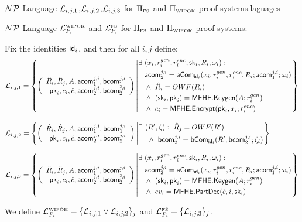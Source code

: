 \begin{boxfig}{${{\cal NP}}$-Language ${{\cal L}_{i,j,1}}$,${{\cal L}_{i,j,2}}$,${{\cal L}_{i,j,3}}$ for $\Pi_{\scriptscriptstyle\mathrm{FS}}$ and $\Pi_{\scriptscriptstyle\mathrm{WIPOK}}$ proof systems.}{laguages}

\centerline{${{\cal NP}}$-Language ${{\cal L}^{\scriptscriptstyle\mathrm{WIPOK}}_{P_i}}$ and ${{{\mathsf{{\cal L}}}^{{\scriptscriptstyle\mathrm{FS}}}_{P_i}}}$ for $\Pi_{\scriptscriptstyle\mathrm{FS}}$ and $\Pi_{\scriptscriptstyle\mathrm{WIPOK}}$ proof systems:}

\medskip\noindent
Fix the identities $\mathsf{id}_i$, and then for all $i,j$ define:
\begin{equation*}
{{\cal L}_{i,j,1}} =\left\{
\left(\begin{array}{r}
  \hat{R}_i,\hat{R}_j,A,\mathsf{acom}_1^{j,i},{\mathsf{bcom}}_1^{j,i}\\
  {\mathsf{pk}}_i,c_i,{{\hat{c}}},\mathsf{acom}_2^{j,i},{\mathsf{bcom}}_2^{j,i}
\end{array}\right)\left|
         \begin{split} \exists ~& (x_i,r^{gen}_i,r^{enc}_i,{\mathsf{sk}}_i,R_i,\omega_i):\\
         ~& \mathsf{acom}^{j,i}_2
           =\mathsf{aCom}_{\mathsf{id}_i}(x_i,r^{gen}_i,r^{enc}_i,R_i;\mathsf{acom}_1^{j,i};\omega_{i}) \\
         ~& \land~\hat{R}_i = OWF(R_i) \\
         ~& \land~({\mathsf{sk}}_i,{\mathsf{pk}}_i)=\mathsf{MFHE.Keygen}(A;r^{gen}_i)\\
         ~& \land~c_i={\mathsf{MFHE.Encrypt}}({\mathsf{pk}}_i,x_i;r^{enc}_i)
               \end{split}\right.
    \right\}
    \end{equation*}

\begin{equation*}
    {{\cal L}_{i,j,2}} =\left\{
\left(\begin{array}{r}
  \hat{R}_i,\hat{R}_j,A,\mathsf{acom}_1^{j,i},{\mathsf{bcom}}_1^{j,i}\\
  {\mathsf{pk}}_i,c_i,{{\hat{c}}},\mathsf{acom}_2^{j,i},{\mathsf{bcom}}_2^{j,i}
\end{array}\right)\left| \begin{split} \exists ~& (R', \zeta):~
  \hat{R}_j=OWF(R')\\
    ~& ~\land~ {\mathsf{bcom}}_2^{j,i}=\mathsf{bCom}_{\mathsf{id}_i}(R';{\mathsf{bcom}}_2^{j,i};\zeta_{i})
\end{split}
    \right.\right\}~~~~~~~~~~~~
    \end{equation*}

\begin{equation*}
    {{\cal L}_{i,j,3}} =\left\{
\left(\begin{array}{r}
  \hat{R}_i,\hat{R}_j,A,\mathsf{acom}_1^{j,i},{\mathsf{bcom}}_1^{j,i}\\
  {\mathsf{pk}}_i,c_i,{{\hat{c}}},\mathsf{acom}_2^{j,i},{\mathsf{bcom}}_2^{j,i}
\end{array}\right)\left|
         \begin{split} \exists ~& (x_i,r^{gen}_i,r^{enc}_i,{\mathsf{sk}}_i,R_i,\omega_i):\\
         ~& \mathsf{acom}^{j,i}_2
           =\mathsf{aCom}_{\mathsf{id}_i}(x_i,r^{gen}_i,r^{enc}_i,R_i;\mathsf{acom}_1^{j,i};\omega_{i}) \\
         ~& \land~({\mathsf{sk}}_i,{\mathsf{pk}}_i)=\mathsf{MFHE.Keygen}(A;r^{gen}_i)\\
         ~& \land~ev_i= {\mathsf{MFHE.PartDec}}({{\hat{c}}}, i, {\mathsf{sk}}_i)
               \end{split}\right.
    \right\}
    \end{equation*}

We define ${{\cal L}^{\scriptscriptstyle\mathrm{WIPOK}}_{P_i}}=\{{{\cal L}_{i,j,1}}\lor{{\cal L}_{i,j,2}}\}_{j}$ and ${{{\mathsf{{\cal L}}}^{{\scriptscriptstyle\mathrm{FS}}}_{P_i}}}=\{{{\cal L}_{i,j,3}}\}_j$.
\label{NPL}
\end{boxfig}


